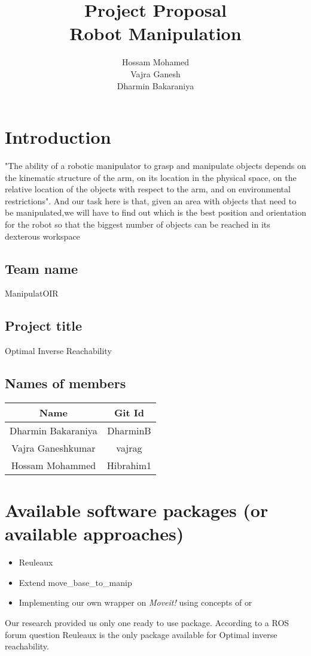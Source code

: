 \documentclass[12pt]{article}
\title{Project Proposal\\Robot Manipulation}
\author{Hossam Mohamed \\ Vajra Ganesh \\Dharmin Bakaraniya}
\begin{document}
\maketitle{}
\section{Introduction}
"The ability of a robotic manipulator to grasp and manipulate objects depends on the kinematic structure of the arm, on its location in the physical space, on the relative location of the objects with respect to the arm, and on environmental restrictions".\cite{intro}
And our task here is that, given an area with objects that need to be manipulated,we will have to find out which is the best position and orientation for the robot so that the biggest number of objects can be reached in its dexterous workspace

\subsection{Team name}
ManipulatOIR
\subsection{Project title}
Optimal Inverse Reachability
\subsection{Names of members}
        \begin{tabular}{|c|c|}
                \hline
                \textbf{Name} & \textbf{Git Id}\\\hline
                Dharmin Bakaraniya & DharminB\\\hline
                Vajra Ganeshkumar & vajrag\\\hline
                Hossam Mohammed & Hibrahim1\\\hline
        \end{tabular}

\section{Available software packages (or available approaches)}
\begin{itemize}
        \item Reuleaux\cite{makhal}\cite{reuleaux}
        \item Extend move\_base\_to\_manip\cite{movebasetomanip}
        \item Implementing our own wrapper on \textit{Moveit!} using concepts of \cite{malek} \cite{park} or \cite{rastegar}
\end{itemize}
Our research provided us only one ready to use package. According to a ROS forum question\cite{rosquestion} Reuleaux is the only package available for Optimal inverse reachability.
\end{document}
